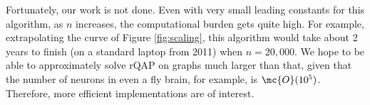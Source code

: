 \documentclass[10pt,journal,cspaper,compsoc]{IEEEtran}
\begin{document}



Fortunately, our work is not done. Even with very small leading constants for this algorithm, as $n$ increases, the computational burden gets quite high.  For example, extrapolating the curve of Figure \ref{fig:scaling}, this algorithm would take about 2 years to finish (on a standard laptop from 2011) when $n=20,000$.  We hope to be able to approximately solve rQAP on graphs much larger than that, given that the number of neurons in even a fly brain, for example, is $\mc{O}(10^5)$.  Therefore, more efficient implementations are of interest.  

\end{document}
